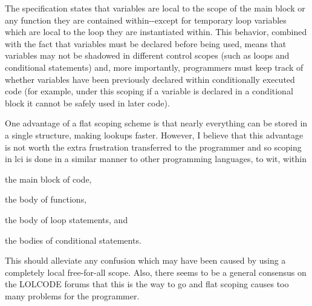 The specification states that variables are local to the scope of the main block or any function they are contained within-\/-\/except for temporary loop variables which are local to the loop they are instantiated within. This behavior, combined with the fact that variables must be declared before being used, means that variables may not be shadowed in different control scopes (such as loops and conditional statements) and, more importantly, programmers must keep track of whether variables have been previously declared within conditionally executed code (for example, under this scoping if a variable is declared in a conditional block it cannot be safely used in later code).

One advantage of a flat scoping scheme is that nearly everything can be stored in a single structure, making lookups faster. However, I believe that this advantage is not worth the extra frustration transferred to the programmer and so scoping in lci is done in a similar manner to other programming languages, to wit, within
\begin{DoxyItemize}
\item the main block of code,
\item the body of functions,
\item the body of loop statements, and
\item the bodies of conditional statements.
\end{DoxyItemize}

This should alleviate any confusion which may have been caused by using a completely local free-\/for-\/all scope. Also, there seems to be a general consensus on the L\-O\-L\-C\-O\-D\-E forums that this is the way to go and flat scoping causes too many problems for the programmer. 